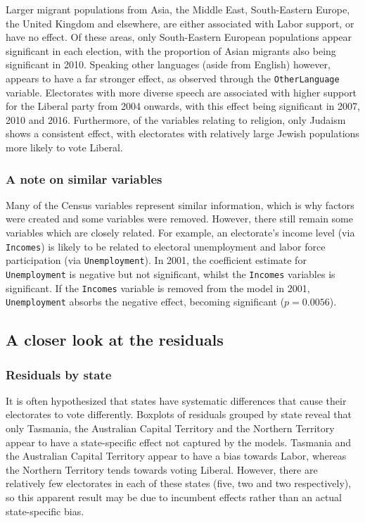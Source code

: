 \documentclass[11pt,a4paper,]{article}
\begin{document}
Larger migrant populations from Asia, the Middle East, South-Eastern Europe, the United Kingdom and elsewhere, are either associated with Labor support, or have no effect. Of these areas, only South-Eastern European populations appear significant in each election, with the proportion of Asian migrants also being significant in 2010. Speaking other languages (aside from English) however, appears to have a far stronger effect, as observed through the \texttt{OtherLanguage} variable. Electorates with more diverse speech are associated with higher support for the Liberal party from 2004 onwards, with this effect being significant in 2007, 2010 and 2016. Furthermore, of the variables relating to religion, only Judaism shows a consistent effect, with electorates with relatively large Jewish populations more likely to vote Liberal.

\hypertarget{a-note-on-similar-variables}{%
\subsubsection{A note on similar variables}\label{a-note-on-similar-variables}}

Many of the Census variables represent similar information, which is why factors were created and some variables were removed. However, there still remain some variables which are closely related. For example, an electorate's income level (via \texttt{Incomes}) is likely to be related to electoral unemployment and labor force participation (via \texttt{Unemployment}). In 2001, the coefficient estimate for \texttt{Unemployment} is negative but not significant, whilst the \texttt{Incomes} variables is significant. If the \texttt{Incomes} variable is removed from the model in 2001, \texttt{Unemployment} absorbs the negative effect, becoming significant (\(p = 0.0056\)).

\hypertarget{a-closer-look-at-the-residuals}{%
\subsection{A closer look at the residuals}\label{a-closer-look-at-the-residuals}}

\hypertarget{residuals-by-state}{%
\subsubsection{Residuals by state}\label{residuals-by-state}}

It is often hypothesized that states have systematic differences that cause their electorates to vote differently. Boxplots of residuals grouped by state reveal that only Tasmania, the Australian Capital Territory and the Northern Territory appear to have a state-specific effect not captured by the models. Tasmania and the Australian Capital Territory appear to have a bias towards Labor, whereas the Northern Territory tends towards voting Liberal. However, there are relatively few electorates in each of these states (five, two and two respectively), so this apparent result may be due to incumbent effects rather than an actual state-specific bias.
\end{document}
